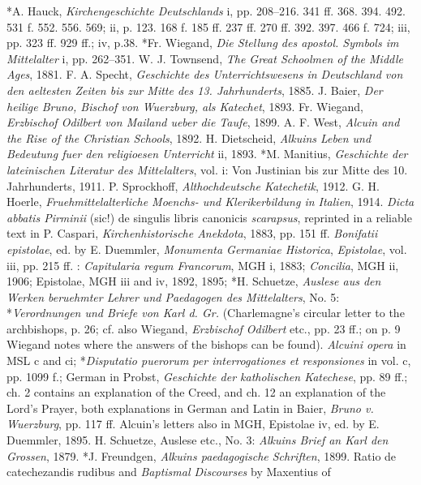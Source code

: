 *A. Hauck, \emph{Kirchengeschichte Deutschlands} i, pp. 208–216. 341 ff. 368. 394. 492. 531 f. 552. 556. 569; ii, p. 123. 168 f. 185 ff. 237 ff. 270 ff. 392. 397. 466 f. 724; iii, pp. 323 ff. 929 ff.; iv, p.38. *Fr. Wiegand, \emph{Die Stellung des apostol. Symbols im Mittelalter} i, pp. 262–351. W. J. Townsend, \emph{The Great Schoolmen of the Middle Ages}, 1881. F. A. Specht, \emph{Geschichte des Unterrichtswesens in Deutschland von den aeltesten Zeiten bis zur Mitte des 13. Jahrhunderts}, 1885. J. Baier, \emph{Der heilige Bruno, Bischof von Wuerzburg, als Katechet}, 1893. Fr. Wiegand, \emph{Erzbischof Odilbert von Mailand ueber die Taufe}, 1899. A. F. West, \emph{Alcuin and the Rise of the Christian Schools}, 1892. H. Dietscheid, \emph{Alkuins Leben und Bedeutung fuer den religioesen Unterricht} ii, 1893. *M. Manitius, \emph{Geschichte der lateinischen Literatur des Mittelalters}, vol. i: Von Justinian bis zur Mitte des 10. Jahrhunderts, 1911. P. Sprockhoff, \emph{Althochdeutsche Katechetik}, 1912. G. H. Hoerle, \emph{Fruehmittelalterliche Moenchs- und Klerikerbildung in Italien}, 1914. \emph{Dicta abbatis Pirminii} (sic!) de singulis libris canonicis \emph{scarapsus}, reprinted in a reliable text in P. Caspari, \emph{Kirchenhistorische Anekdota}, 1883, pp. 151 ff. \emph{Bonifatii epistolae}, ed. by E. Duemmler, \emph{Monumenta Germaniae Historica}, \emph{Epistolae}, vol. iii, pp. 215 ff. : \emph{Capitularia regum Francorum}, MGH i, 1883; \emph{Concilia}, MGH ii, 1906; Epistolae, MGH iii and iv, 1892, 1895; *H. Schuetze, \emph{Auslese aus den Werken beruehmter Lehrer und Paedagogen des Mittelalters}, No. 5: *\emph{Verordnungen und Briefe von Karl d. Gr.} (Charlemagne's circular letter to the archbishops, p. 26; cf. also Wiegand, \emph{Erzbischof Odilbert} etc., pp. 23 ff.; on p. 9 Wiegand notes where the answers of the bishops can be found). \emph{Alcuini opera} in MSL c and ci; *\emph{Disputatio puerorum per interrogationes et responsiones} in vol. c, pp. 1099 f.; German in Probst, \emph{Geschichte der katholischen Katechese}, pp. 89 ff.; ch. 2 contains an explanation of the Creed, and ch. 12 an explanation of the Lord's Prayer, both explanations in German and Latin in Baier, \emph{Bruno v. Wuerzburg}, pp. 117 ff. Alcuin's letters also in MGH, Epistolae iv, ed. by E. Duemmler, 1895. H. Schuetze, Auslese etc., No. 3: \emph{Alkuins Brief an Karl den Grossen}, 1879. *J. Freundgen, \emph{Alkuins paedagogische Schriften}, 1899. Ratio de catechezandis rudibus and \emph{Baptismal Discourses} by Maxentius of
